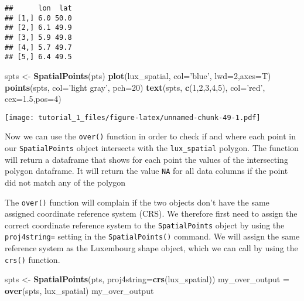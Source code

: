 \documentclass[]{article}
\newenvironment{Shaded}{\begin{snugshade}}{\end{snugshade}}
\newcommand{\DataTypeTok}[1]{\textcolor[rgb]{0.13,0.29,0.53}{#1}}
\newcommand{\DecValTok}[1]{\textcolor[rgb]{0.00,0.00,0.81}{#1}}
\newcommand{\FloatTok}[1]{\textcolor[rgb]{0.00,0.00,0.81}{#1}}
\newcommand{\KeywordTok}[1]{\textcolor[rgb]{0.13,0.29,0.53}{\textbf{#1}}}
\newcommand{\NormalTok}[1]{#1}
\newcommand{\StringTok}[1]{\textcolor[rgb]{0.31,0.60,0.02}{#1}}
\begin{document}
\begin{verbatim}
##      lon  lat
## [1,] 6.0 50.0
## [2,] 6.1 49.9
## [3,] 5.9 49.8
## [4,] 5.7 49.7
## [5,] 6.4 49.5
\end{verbatim}

\begin{Shaded}
\begin{Highlighting}[]
\NormalTok{spts <-}\StringTok{ }\KeywordTok{SpatialPoints}\NormalTok{(pts)}
\KeywordTok{plot}\NormalTok{(lux_spatial, }\DataTypeTok{col=}\StringTok{'blue'}\NormalTok{, }\DataTypeTok{lwd=}\DecValTok{2}\NormalTok{,}\DataTypeTok{axes=}\NormalTok{T)}
\KeywordTok{points}\NormalTok{(spts, }\DataTypeTok{col=}\StringTok{'light gray'}\NormalTok{, }\DataTypeTok{pch=}\DecValTok{20}\NormalTok{)}
\KeywordTok{text}\NormalTok{(spts, }\KeywordTok{c}\NormalTok{(}\DecValTok{1}\NormalTok{,}\DecValTok{2}\NormalTok{,}\DecValTok{3}\NormalTok{,}\DecValTok{4}\NormalTok{,}\DecValTok{5}\NormalTok{), }\DataTypeTok{col=}\StringTok{'red'}\NormalTok{, }\DataTypeTok{cex=}\FloatTok{1.5}\NormalTok{,}\DataTypeTok{pos=}\DecValTok{4}\NormalTok{)}
\end{Highlighting}
\end{Shaded}

\texttt{[image: tutorial\_1\_files/figure-latex/unnamed-chunk-49-1.pdf]}

Now we can use the \texttt{over()} function in order to check if and
where each point in our \texttt{SpatialPoints} object intersects with
the \texttt{lux\_spatial} polygon. The function will return a dataframe
that shows for each point the values of the intersecting polygon
dataframe. It will return the value \texttt{NA} for all data columns if
the point did not match any of the polygon

The \texttt{over()} function will complain if the two objects don't have
the same assigned coordinate reference system (CRS). We therefore first
need to assign the correct coordinate reference system to the
\texttt{SpatialPoints} object by using the \texttt{proj4string=} setting
in the \texttt{SpatialPoints()} command. We will assign the same
reference system as the Luxembourg shape object, which we can call by
using the \texttt{crs()} function.

\begin{Shaded}
\begin{Highlighting}[]
\NormalTok{spts <-}\StringTok{ }\KeywordTok{SpatialPoints}\NormalTok{(pts, }\DataTypeTok{proj4string=}\KeywordTok{crs}\NormalTok{(lux_spatial))}
\NormalTok{my_over_output =}\StringTok{ }\KeywordTok{over}\NormalTok{(spts, lux_spatial)}
\NormalTok{my_over_output}
\end{Highlighting}
\end{Shaded}
\end{document}
